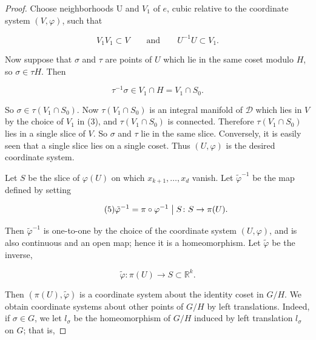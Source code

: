 \begin{proof}
Choose neighborhoods U and $V_{1}$ of $e$, cubic relative to the coordinate system $(V,\varphi)$, such that

\begin{equation}
\tag{3}\label{eq:3.58:3}
V_{1}V_{1}\subset V\qquad\mathrm{and}\qquad U^{-1}U\subset V_{1}.
\end{equation}

Now suppose that $\sigma$ and $\tau$ are points of $U$ which lie in the same coset modulo $H$, so $\sigma \in \tau H$. Then

\begin{equation}
\tag{4}\label{eq:3.58:4}
\tau^{-1}\sigma\in V_{1}\cap H=V_{1}\cap S_{0}.
\end{equation}

So $\sigma \in \tau(V_1 \cap S_0)$. Now $\tau(V_1 \cap S_0)$ is an integral manifold of $\mathcal{D}$ which lies in $V$ by the choice of $V_1$ in (3), and $\tau(V_1 \cap S_0)$ is connected. Therefore $\tau(V_1 \cap S_0)$ lies in a single slice of $V$. So $\sigma$ and $\tau$ lie in the same slice. Conversely, it is easily seen that a single slice lies on a single coset. Thus $(U, \varphi)$ is the desired coordinate system.

\begin{center}
\end{center}

Let $S$ be the slice of $\varphi(U)$ on which $x_{k+1},\ldots,x_{d}$ vanish. Let $\widetilde{\varphi}^{-1}$ be the map defined by setting

\begin{equation}
\tag{5}\label{eq:3.58:5}
\tilde{\varphi}^{-1}=\pi\circ\varphi^{-1}\bigm|S\colon S\to\pi(U).
\end{equation}

Then $\tilde{\varphi}^{-1}$ is one-to-one by the choice of the coordinate system $(U,\varphi)$, and is also continuous and an open map; hence it is a homeomorphism. Let $\tilde{\varphi}$ be the inverse,

\begin{equation}
\tag{6}\label{eq:3.58:6}
\tilde{\varphi}\colon\pi(U)\to S\subset\mathbb{R}^{k}.
\end{equation}

Then $(\pi(U),\tilde{\varphi})$ is a coordinate system about the identity coset in $G/H$. We obtain coordinate systems about other points of $G/H$ by left translations. Indeed, if $\sigma\in G$, we let $l_\sigma$ be the homeomorphism of $G/H$ induced by left translation $l_\sigma$ on $G$; that is,


\end{proof}
